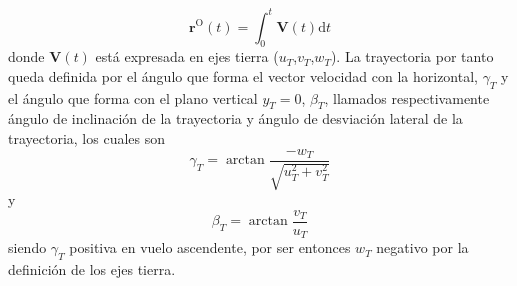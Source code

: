 \begin{equation}
	\mathrm{\textbf{r}^O}(t)=\int_{0}^{t}\mathrm{\textbf{V}}(t)\mathrm{d}t
\end{equation}
donde $\mathrm{\textbf{V}}(t)$ está expresada en ejes tierra ($u_T$,$v_T$,$w_T$). La trayectoria por tanto queda definida por el ángulo que forma el vector velocidad con la horizontal, $\gamma_T$ y el ángulo que forma con el plano vertical $y_T=0$, $\beta_T$, llamados respectivamente ángulo de inclinación de la trayectoria y ángulo de desviación lateral de la trayectoria, los cuales son
\begin{equation}
	\gamma_T=\arctan\frac{-w_T}{\sqrt{u_T^2+v_T^2}}
	\label{gammat}
\end{equation}
y
\begin{equation}
\beta_T=\arctan\frac{v_T}{u_T}
\label{betat}
\end{equation}
siendo $\gamma_T$ positiva en vuelo ascendente, por ser entonces $w_T$ negativo por la definición de los ejes tierra.

